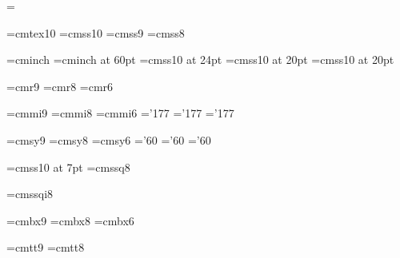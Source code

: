 \def\weavesectionsss#1#2#3#4#5{\vfill\eject\noindent{\titlefont #2}\mark{#3}\vskip 0.5in\par\noindent\titlepage}
\def\weavesectionss#1#2#3#4#5{\vfill\eject\noindent{\stitlefont #2\hfill #5}\mark{#3}\bigskip\par\noindent\titlepage}
\def\weavesections#1#2#3#4#5{\bigskip\goodbreak\noindent{\bf #4#1. #2.}\mark{#3}\quad}
\def\weavesection#1#2#3#4#5{\bigskip\goodbreak\noindent{\bf #4#1.}\mark{#3}\quad}
\def\nsweavesections#1#2#3#4#5{\noindent{\bf #4#1. #2.}\mark{#3}\quad}
\def\nsweavesection#1#2#3#4#5{\noindent{\bf #4#1.}\mark{#3}\quad}

\raggedbottom

\nopagenumbers
\newif\iftitle
\def\titlepage{\global\titletrue}
\headline={\iftitle\hfil\global\titlefalse\else\tenrm\hfil{\sourcefont \firstmark\qquad\the\pageno}\fi}

\titlepage

\def\quotesource#1{{\narrower\smallskip\noindent{\sourcefont #1}\smallskip}}
\def\cast#1#2{{#1}$\;\rightarrow\;${#2}}
\def\comp#1#2{{#1}$\;\sim\;${#2}}
\def\al{$\alpha$}
\def\be{$\beta$}
\def\nonterminal#1{$\langle${\it #1}$\rangle$}
\def\fixed#1{{\bf #1}}
\def\from{\par\qquad\quad$\leftarrow$\quad}
\def\continuation{\par\qquad\quad\phantom{$\leftarrow$}\quad}

\font\tentex=cmtex10
\font\sourcefont=cmss10
\font\xreffont=cmss9
\font\usagefont=cmss8

\font\inchhigh=cminch
\font\sinchhigh=cminch at 60pt
\font\titlefont=cmss10 at 24pt
\font\stitlefont=cmss10 at 20pt
\font\sstitlefont=cmss10 at 20pt

\font\ninerm=cmr9
\font\eightrm=cmr8
\font\sixrm=cmr6

\font\ninei=cmmi9
\font\eighti=cmmi8
\font\sixi=cmmi6
\skewchar\ninei='177 \skewchar\eighti='177 \skewchar\sixi='177

\font\ninesy=cmsy9
\font\eightsy=cmsy8
\font\sixsy=cmsy6
\skewchar\ninesy='60 \skewchar\eightsy='60 \skewchar\sixsy='60

\font\sevenss=cmss10 at 7pt
\font\eightss=cmssq8

\font\eightssi=cmssqi8

\font\ninebf=cmbx9
\font\eightbf=cmbx8
\font\sixbf=cmbx6

\font\ninett=cmtt9
\font\eighttt=cmtt8

\hyphenchar{} %
\hyphenchar{}
\hyphenchar{}

